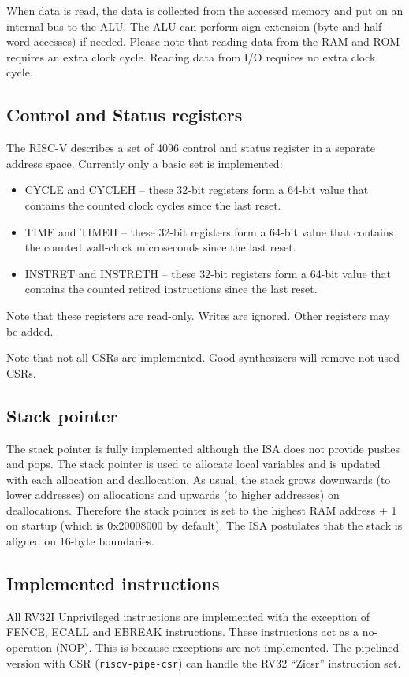 \documentclass[12pt]{article}
\begin{document}
When data is read, the data is collected from the accessed memory and put on an internal bus to the ALU. The ALU can perform sign extension (byte and half word accesses) if needed. Please note that reading data from the RAM and ROM requires an extra clock cycle. Reading data from I/O requires no extra clock cycle.

\subsection{Control and Status registers}
The RISC-V describes a set of 4096 control and status register in a separate address space. Currently only a basic set is implemented:

\begin{itemize}
\item CYCLE and CYCLEH -- these 32-bit registers form a 64-bit value that contains the counted clock cycles since the last reset.
\item TIME and TIMEH -- these 32-bit registers form a 64-bit value that contains the counted wall-clock microseconds since the last reset.
\item INSTRET and INSTRETH -- these 32-bit registers form a 64-bit value that contains the counted retired instructions since the last reset.
\end{itemize}

Note that these registers are read-only. Writes are ignored. Other registers may be added.

Note that not all CSRs are implemented. Good synthesizers will remove not-used CSRs.

\subsection{Stack pointer}
The stack pointer is fully implemented although the ISA does not provide pushes and pops. The stack pointer is used to allocate local variables and is updated with each allocation and deallocation. As usual, the stack grows downwards (to lower addresses) on allocations and upwards (to higher addresses) on deallocations. Therefore the stack pointer is set to the highest RAM address + 1 on startup (which is 0x20008000 by default). The ISA postulates that the stack is aligned on 16-byte boundaries.

\subsection{Implemented instructions}
All RV32I Unprivileged instructions are implemented with the exception of FENCE, ECALL and EBREAK instructions. These instructions act as a no-operation (NOP). This is because exceptions are not implemented. The pipelined version with CSR (\texttt{riscv-pipe-csr}) can handle the RV32 ``Zicsr'' instruction set.
\end{document}
